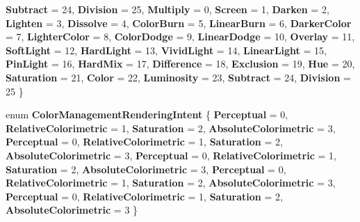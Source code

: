 \begin{DoxyCompactItemize}
{\bfseries Subtract} = 24, 
{\bfseries Division} = 25, 
\newline
{\bfseries Multiply} = 0, 
{\bfseries Screen} = 1, 
{\bfseries Darken} = 2, 
{\bfseries Lighten} = 3, 
\newline
{\bfseries Dissolve} = 4, 
{\bfseries Color\+Burn} = 5, 
{\bfseries Linear\+Burn} = 6, 
{\bfseries Darker\+Color} = 7, 
\newline
{\bfseries Lighter\+Color} = 8, 
{\bfseries Color\+Dodge} = 9, 
{\bfseries Linear\+Dodge} = 10, 
{\bfseries Overlay} = 11, 
\newline
{\bfseries Soft\+Light} = 12, 
{\bfseries Hard\+Light} = 13, 
{\bfseries Vivid\+Light} = 14, 
{\bfseries Linear\+Light} = 15, 
\newline
{\bfseries Pin\+Light} = 16, 
{\bfseries Hard\+Mix} = 17, 
{\bfseries Difference} = 18, 
{\bfseries Exclusion} = 19, 
\newline
{\bfseries Hue} = 20, 
{\bfseries Saturation} = 21, 
{\bfseries Color} = 22, 
{\bfseries Luminosity} = 23, 
\newline
{\bfseries Subtract} = 24, 
{\bfseries Division} = 25
 \}
\item 
\mbox{\label{namespace_microsoft_1_1_graphics_1_1_canvas_1_1_effects_a46519f571ff01b1f57ee3699fc97a7ce}} 
enum {\bfseries Color\+Management\+Rendering\+Intent} \{ \newline
{\bfseries Perceptual} = 0, 
{\bfseries Relative\+Colorimetric} = 1, 
{\bfseries Saturation} = 2, 
{\bfseries Absolute\+Colorimetric} = 3, 
\newline
{\bfseries Perceptual} = 0, 
{\bfseries Relative\+Colorimetric} = 1, 
{\bfseries Saturation} = 2, 
{\bfseries Absolute\+Colorimetric} = 3, 
\newline
{\bfseries Perceptual} = 0, 
{\bfseries Relative\+Colorimetric} = 1, 
{\bfseries Saturation} = 2, 
{\bfseries Absolute\+Colorimetric} = 3, 
\newline
{\bfseries Perceptual} = 0, 
{\bfseries Relative\+Colorimetric} = 1, 
{\bfseries Saturation} = 2, 
{\bfseries Absolute\+Colorimetric} = 3, 
\newline
{\bfseries Perceptual} = 0, 
{\bfseries Relative\+Colorimetric} = 1, 
{\bfseries Saturation} = 2, 
{\bfseries Absolute\+Colorimetric} = 3
 \}
\item 
\mbox{\label{namespace_microsoft_1_1_graphics_1_1_canvas_1_1_effects_a7a6e53eb824ad37f9b09d4149ae14d35}} 

\end{DoxyCompactItemize}
